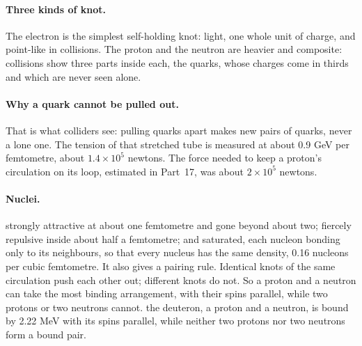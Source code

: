 \documentclass[11pt,a4paper]{article}
\begin{document}
\paragraph{Three kinds of knot.} The electron is the simplest self-holding knot: light, one whole unit of charge, and point-like in collisions. The proton and the neutron are heavier and composite: collisions show three parts inside each, the quarks, whose charges come in thirds and which are never seen alone.  

\paragraph{Why a quark cannot be pulled out.}  That is what colliders see: pulling quarks apart makes new pairs of quarks, never a lone one. The tension of that stretched tube is measured at about 0.9 GeV per femtometre, about $1.4\times10^5$ newtons. The force needed to keep a proton's circulation on its loop, estimated in Part~17, was about $2\times10^5$ newtons. 

\paragraph{Nuclei.}  strongly attractive at about one femtometre and gone beyond about two; fiercely repulsive inside about half a femtometre; and saturated, each nucleon bonding only to its neighbours, so that every nucleus has the same density, 0.16 nucleons per cubic femtometre.  It also gives a pairing rule. Identical knots of the same circulation push each other out; different knots do not. So a proton and a neutron can take the most binding arrangement, with their spins parallel, while two protons or two neutrons cannot.  the deuteron, a proton and a neutron, is bound by 2.22 MeV with its spins parallel, while neither two protons nor two neutrons form a bound pair. 
\end{document}
